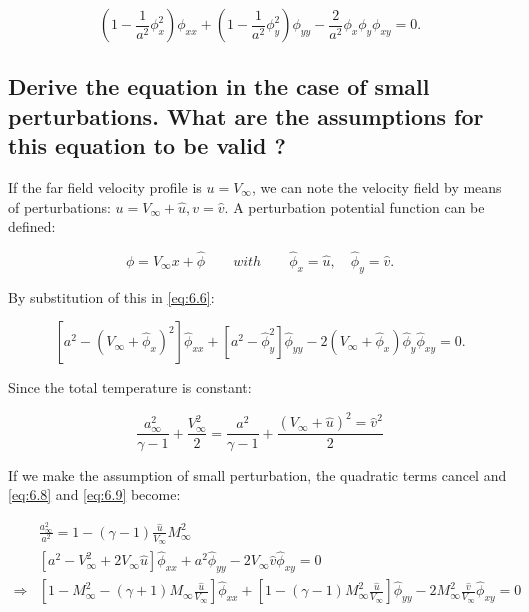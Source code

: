 \documentclass[british,french,11pt, a4paper, openany]{article}
\begin{document}
\begin{equation}
\left( 1-\frac{1}{a^2} \phi^2_x \right) \phi _{xx} + \left( 1-\frac{1}{a^2 }\phi^2_y \right) \phi _{yy} - \frac{2}{a^2} \phi_x \phi_y \phi _{xy} = 0.
\label{eq:6.6}
\end{equation}	


\subsection{Derive the equation in the case of small perturbations. What are the assumptions for this equation to be valid ?}

If the far field velocity profile is $u= V_\infty$, we can note the velocity field by means of perturbations: $u = V_\infty + \hat{u}, v = \hat{v}$. A perturbation potential function can be defined: 

\begin{equation}
\phi = V_\infty x + \hat{\phi}\qquad with \qquad \hat{\phi} _x = \hat{u}, \quad \hat{\phi}_y = \hat{v}. 
\end{equation}

By substitution of this in \eqref{eq:6.6}:

\begin{equation}
\left[ a^2- (V_\infty + \hat{\phi} _x )^2 \right] \hat{\phi} _{xx} + \left[ a^2-\hat{\phi}_y ^2 \right] \hat{\phi} _{yy} - 2 (V_\infty + \hat{\phi} _x) \hat{\phi}_y \hat{\phi} _{xy} = 0.
\label{eq:6.8}
\end{equation}

Since the total temperature is constant:

\begin{equation}
\frac{a^2_\infty}{\gamma -1} + \frac{V_\infty ^2}{2} = \frac{a^2}{\gamma -1} + \frac{(V_\infty + \hat{u}) ^2 = \hat{v}^2}{2} 
\label{eq:6.9}
\end{equation}

If we make the assumption of small perturbation, the quadratic terms cancel and \eqref{eq:6.8} and \eqref{eq:6.9} become:

\begin{equation}
\begin{aligned}
&\frac{a^2_\infty}{a^2} = 1 - (\gamma -1) \frac{\hat{u}}{V_\infty} M^2_\infty\\
&\left[ a^2- V^2_\infty + 2V_\infty \hat{u}  \right] \hat{\phi} _{xx} + a^2 \hat{\phi} _{yy} - 2 V_\infty \hat{v} \hat{\phi} _{xy} = 0 \\ 
\Rightarrow 
&\left[ 1- M_\infty^2 - (\gamma + 1) M_\infty \frac{\hat{u}}{V_\infty} \right] \hat{\phi} _{xx} + \left[ 1 - (\gamma -1 )M_\infty ^2\frac{\hat{u}}{V_\infty} \right] \hat{\phi} _{yy} - 2 M^2_\infty \frac{\hat{v}}{V_\infty} \hat{\phi} _{xy} = 0 
\end{aligned}
\end{equation}
\end{document}

